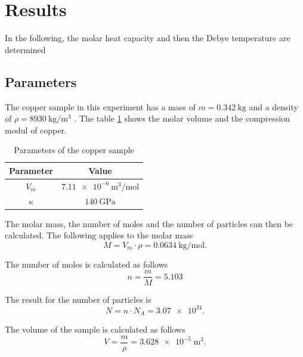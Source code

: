 \section{Results}
\label{sec:results}

In the following, the molar heat capacity and then the Debye temperature are determined

\subsection{Parameters}
\label{sec:parameters}

The copper sample in this experiment has a mass of $m = \qty{0.342}{\kilo\gram}$ \textnormal{\cite{molar_heat}} and a density of
$ \rho = \qty{8930}{\kilo\gram \per \meter^3 }$ \textnormal{\cite{kupfer}}.
The table \ref{tab:parameters} shows the molar volume and the compression modul of copper.
\begin{table}[H]
	\centering
	\caption{Parameters of the copper sample}
	\label{tab:parameters}
	\begin{tabular}{c c }
		\toprule
		Parameter & Value \\
		\midrule
		$V_m$ & $\qty{7.11e-6}{\meter^3 \per \mol}$ \cite{chemie_kupfer}\\
		$\kappa$ & $\qty{140} {\giga\pascal}$ \cite{perioden_kupfer}\\
		\bottomrule
	\end{tabular}
\end{table}

The molar mass, the number of moles and the number of particles can then be calculated.
The following applies to the molar mass
\begin{equation*}
	M = V_m \cdot \rho = \qty{0.0634}{\kilo\gram \per \mol}.
\end{equation*}

The number of moles is calculated as follows
\begin{equation*}
	n = \frac{m}{M} = \num{5.103}
\end{equation*}

The result for the number of particles is
\begin{equation*}
	N = n \cdot N_A = \num{3.07e24}.
\end{equation*}

The volume of the sample is calculated as follows
\begin{equation*}
	V = \frac{m}{\rho} = \qty{3.628e-5}{\meter^3}.
\end{equation*}


